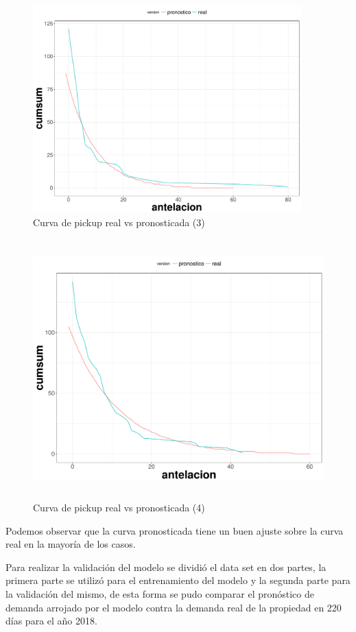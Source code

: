 \begin{figure}[H]
  \centering
      \includegraphics[width=\maxwidth,height=8cm]{figures/Resultados-3}  
  \caption{Curva de pickup real vs pronosticada (3)}
\end{figure}

\begin{figure}[H]
  \centering
      \includegraphics[width=\maxwidth,height=10cm]{figures/Resultados-4}  
  \caption{Curva de pickup real vs pronosticada (4)}
\end{figure}

Podemos observar que la curva pronosticada tiene un buen ajuste sobre la curva real en la mayoría de los casos.

Para realizar la validación del modelo se dividió el data set en dos partes, la primera parte se utilizó para el entrenamiento del modelo y la segunda parte para la validación del mismo, de esta forma se pudo comparar el pronóstico de demanda arrojado por el modelo contra la demanda real de la propiedad en 220 días para el año 2018.

